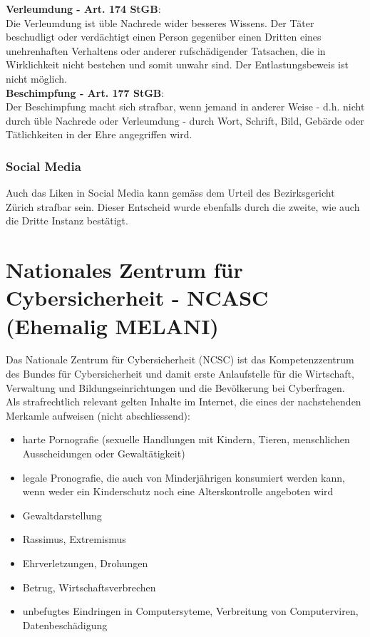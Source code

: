 \documentclass{report}
\theoremstyle{definition}
\theoremstyle{example}
\begin{document}
\textbf{Verleumdung - Art. 174 StGB}:\\
Die Verleumdung ist üble Nachrede wider besseres Wissens. Der Täter beschudligt oder verdächtigt einen Person gegenüber einen Dritten eines unehrenhaften Verhaltens oder anderer rufschädigender Tatsachen, die in Wirklichkeit nicht bestehen und somit unwahr sind. Der Entlastungsbeweis ist nicht möglich.\\

\textbf{Beschimpfung - Art. 177 StGB}:\\
Der Beschimpfung macht sich strafbar, wenn jemand in anderer Weise - d.h. nicht durch üble Nachrede oder Verleumdung - durch Wort, Schrift, Bild, Gebärde oder Tätlichkeiten in der Ehre angegriffen wird.

\subsubsection{Social Media}
Auch das Liken in Social Media kann gemäss dem Urteil des Bezirksgericht Zürich strafbar sein. Dieser Entscheid wurde ebenfalls durch die zweite, wie auch die Dritte Instanz bestätigt.

\section{Nationales Zentrum für Cybersicherheit - NCASC (Ehemalig MELANI)}
Das Nationale Zentrum für Cybersicherheit (NCSC) ist das Kompetenzzentrum des Bundes für Cybersicherheit und damit erste Anlaufstelle für die Wirtschaft, Verwaltung und Bildungseinrichtungen und die Bevölkerung bei Cyberfragen.\\
Als strafrechtlich relevant gelten Inhalte im Internet, die eines der nachstehenden Merkamle aufweisen (nicht abschliessend):
\begin{itemize}
   \item harte Pornografie (sexuelle Handlungen mit Kindern, Tieren, menschlichen Ausscheidungen oder Gewaltätigkeit)
   \item legale Pronografie, die auch von Minderjährigen konsumiert werden kann, wenn weder ein Kinderschutz noch eine Alterskontrolle angeboten wird
   \item Gewaltdarstellung
   \item Rassimus, Extremismus
   \item Ehrverletzungen, Drohungen
   \item Betrug, Wirtschaftsverbrechen
   \item unbefugtes Eindringen in Computersyteme, Verbreitung von Computerviren, Datenbeschädigung
\end{itemize}
\end{document}
